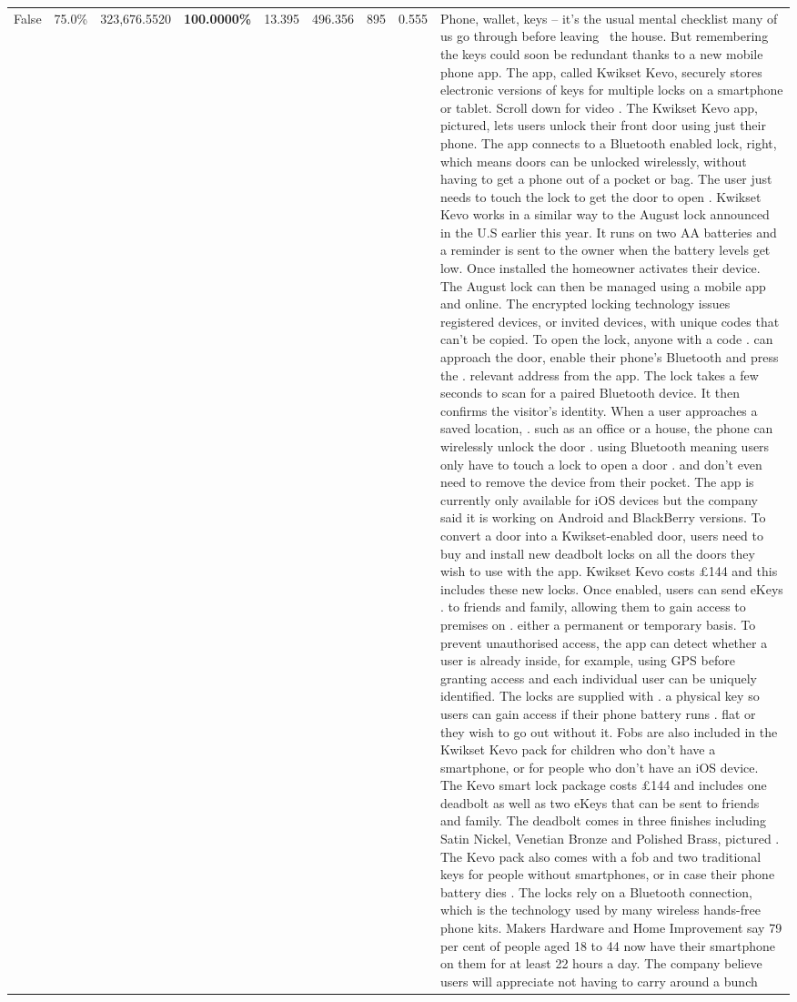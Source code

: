 \begin{table}[H]
\begin{tabular}{lllrlllll}
False & 75.0\% & 323,676.5520 & \bfseries \color{red} 100.0000\% & 13.395 & 496.356 & 895 & 0.555 & Phone, wallet, keys – it’s the usual mental checklist many of us go through before leaving  the house. But remembering the keys could soon be redundant thanks to a new mobile phone app. The app, called Kwikset Kevo, securely stores electronic versions of keys for multiple locks on a smartphone or tablet. Scroll down for video . The Kwikset Kevo app, pictured, lets users unlock their front door using just their phone. The app connects to a Bluetooth enabled lock, right, which means doors can be unlocked wirelessly, without having to get a phone out of a pocket or bag. The user just needs to touch the lock to get the door to open . Kwikset Kevo works in a similar way to the August lock announced in the U.S earlier this year. It runs on two AA batteries and a reminder is sent to the owner when the battery levels get low. Once installed the homeowner activates their device. The August lock can then be managed using a mobile app and online. The encrypted locking technology issues registered devices, or invited devices, with unique codes that can't be copied. To open the lock, anyone with a code . can approach the door, enable their phone's Bluetooth and press the . relevant address from the app. The lock takes a few seconds to scan for a paired Bluetooth device. It then confirms the visitor's identity. When a user approaches a saved location, . such as an office or a house, the phone can wirelessly unlock the door . using Bluetooth meaning users only have to touch a lock to open a door . and don't even need to remove the device from their pocket. The app is currently only available for iOS devices but the company said it is working on Android and BlackBerry versions. To convert a door into a Kwikset-enabled door, users need to buy and install new deadbolt locks on all the doors they wish to use with the app. Kwikset Kevo costs £144 and this includes these new locks. Once enabled, users can send eKeys . to friends and family, allowing them to gain access to premises on . either a permanent or temporary basis. To prevent unauthorised access, the app can detect whether a user is already inside, for example, using GPS before granting access and each individual user can be uniquely identified. The locks are supplied with . a physical key so users can gain access if their phone battery runs . flat or they wish to go out without it. Fobs are also included in the Kwikset Kevo pack for children who don't have a smartphone, or for people who don't have an iOS device. The Kevo smart lock package costs £144 and includes one deadbolt as well as two eKeys that can be sent to friends and family. The deadbolt comes in three finishes including Satin Nickel, Venetian Bronze and Polished Brass, pictured . The Kevo pack also comes with a fob and two traditional keys for people without smartphones, or in case their phone battery dies . The locks rely on a Bluetooth connection, which is the technology used by many wireless hands-free phone kits. Makers Hardware and Home Improvement say 79 per cent of people aged 18 to 44 now have their smartphone on them for at least 22 hours a day. The company believe users will appreciate not having to carry around a bunch 
\end{tabular}
\end{table}
